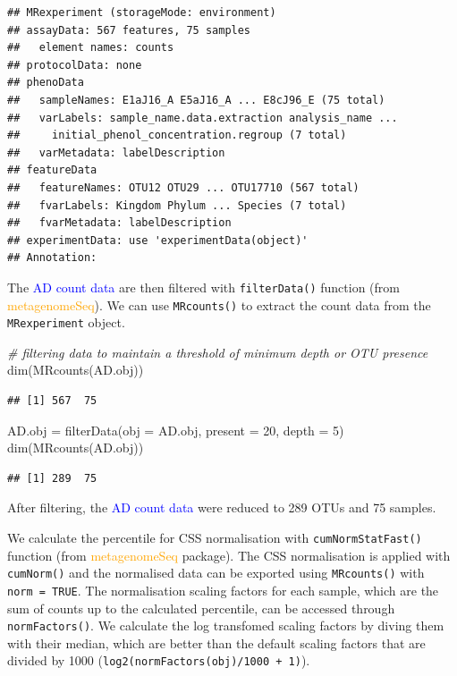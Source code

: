 \documentclass[
]{book}
\newenvironment{Shaded}{\begin{snugshade}}{\end{snugshade}}
\newcommand{\AttributeTok}[1]{\textcolor[rgb]{0.77,0.63,0.00}{#1}}
\newcommand{\CommentTok}[1]{\textcolor[rgb]{0.56,0.35,0.01}{\textit{#1}}}
\newcommand{\DecValTok}[1]{\textcolor[rgb]{0.00,0.00,0.81}{#1}}
\newcommand{\FunctionTok}[1]{\textcolor[rgb]{0.00,0.00,0.00}{#1}}
\newcommand{\NormalTok}[1]{#1}
\newcommand{\OtherTok}[1]{\textcolor[rgb]{0.56,0.35,0.01}{#1}}
\begin{document}
\begin{verbatim}
## MRexperiment (storageMode: environment)
## assayData: 567 features, 75 samples 
##   element names: counts 
## protocolData: none
## phenoData
##   sampleNames: E1aJ16_A E5aJ16_A ... E8cJ96_E (75 total)
##   varLabels: sample_name.data.extraction analysis_name ...
##     initial_phenol_concentration.regroup (7 total)
##   varMetadata: labelDescription
## featureData
##   featureNames: OTU12 OTU29 ... OTU17710 (567 total)
##   fvarLabels: Kingdom Phylum ... Species (7 total)
##   fvarMetadata: labelDescription
## experimentData: use 'experimentData(object)'
## Annotation:
\end{verbatim}

The \textcolor{blue}{AD count data} are then filtered with \texttt{filterData()} function (from \textcolor{orange}{metagenomeSeq}). We can use \texttt{MRcounts()} to extract the count data from the \texttt{MRexperiment} object.

\begin{Shaded}
\begin{Highlighting}[]
\CommentTok{\# filtering data to maintain a threshold of minimum depth or OTU presence}
\FunctionTok{dim}\NormalTok{(}\FunctionTok{MRcounts}\NormalTok{(AD.obj))}
\end{Highlighting}
\end{Shaded}

\begin{verbatim}
## [1] 567  75
\end{verbatim}

\begin{Shaded}
\begin{Highlighting}[]
\NormalTok{AD.obj }\OtherTok{=} \FunctionTok{filterData}\NormalTok{(}\AttributeTok{obj =}\NormalTok{ AD.obj, }\AttributeTok{present =} \DecValTok{20}\NormalTok{, }\AttributeTok{depth =} \DecValTok{5}\NormalTok{)}
\FunctionTok{dim}\NormalTok{(}\FunctionTok{MRcounts}\NormalTok{(AD.obj))}
\end{Highlighting}
\end{Shaded}

\begin{verbatim}
## [1] 289  75
\end{verbatim}

After filtering, the \textcolor{blue}{AD count data} were reduced to 289 OTUs and 75 samples.

We calculate the percentile for CSS normalisation with \texttt{cumNormStatFast()} function (from \textcolor{orange}{metagenomeSeq} package). The CSS normalisation is applied with \texttt{cumNorm()} and the normalised data can be exported using \texttt{MRcounts()} with \texttt{norm\ =\ TRUE}. The normalisation scaling factors for each sample, which are the sum of counts up to the calculated percentile, can be accessed through \texttt{normFactors()}. We calculate the log transfomed scaling factors by diving them with their median, which are better than the default scaling factors that are divided by 1000 (\texttt{log2(normFactors(obj)/1000\ +\ 1)}).
\end{document}
